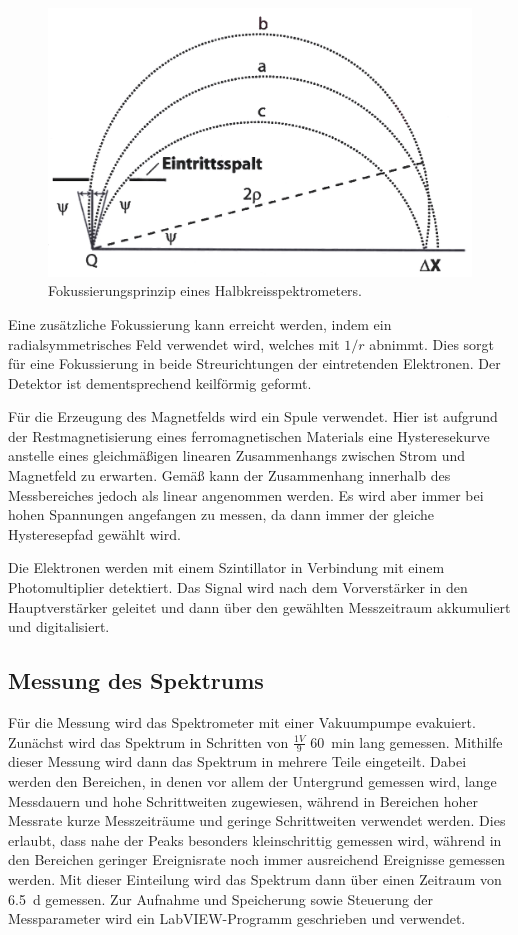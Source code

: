 \documentclass[
	a4paper,
	12pt,
	pagesize,
	ngerman
]{scrartcl}
\begin{document}
	\begin{figure}[H]
			\includegraphics[width= 0.6 \linewidth]{img/spektrometer_schema}
			\caption{
			Fokussierungsprinzip eines Halbkreisspektrometers.
			\cite{Anleitung}
			}
			\label{fig_Halbkreisspektrometer}
	\end{figure}

	Eine zusätzliche Fokussierung kann erreicht werden, indem ein radialsymmetrisches Feld verwendet wird, welches mit $1/r$ abnimmt.
	Dies sorgt für eine Fokussierung in beide Streurichtungen der eintretenden Elektronen.
	Der Detektor ist dementsprechend keilförmig geformt.

	Für die Erzeugung des Magnetfelds wird ein Spule verwendet.
	Hier ist aufgrund der Restmagnetisierung eines ferromagnetischen Materials eine Hysteresekurve anstelle eines gleichmäßigen linearen Zusammenhangs zwischen Strom und Magnetfeld zu erwarten. %
	Gemäß \cite{Anleitung} kann der Zusammenhang innerhalb des Messbereiches jedoch als linear angenommen werden.
	Es wird aber immer bei hohen Spannungen angefangen zu messen, da dann immer der gleiche Hysteresepfad gewählt wird.

	Die Elektronen werden mit einem Szintillator in Verbindung mit einem Photomultiplier detektiert.
	Das Signal wird nach dem Vorverstärker in den Hauptverstärker geleitet und dann über den gewählten Messzeitraum akkumuliert und digitalisiert.

	\subsection{Messung des Spektrums}

	Für die Messung wird das Spektrometer mit einer Vakuumpumpe evakuiert.
	Zunächst wird das Spektrum in Schritten von $\frac{1 \si{V}}{9}$  \SI{60}{\minute} lang gemessen. %
	Mithilfe dieser Messung wird dann das Spektrum in mehrere Teile eingeteilt.
	Dabei werden den Bereichen, in denen vor allem der Untergrund gemessen wird, lange Messdauern und hohe Schrittweiten zugewiesen, während in Bereichen hoher Messrate kurze Messzeiträume und geringe Schrittweiten verwendet werden.
	Dies erlaubt, dass nahe der Peaks besonders kleinschrittig gemessen wird, während in den Bereichen geringer Ereignisrate noch immer ausreichend Ereignisse gemessen werden.
	Mit dieser Einteilung wird das Spektrum dann über einen Zeitraum von \SI{6,5}{\day} gemessen.
	Zur Aufnahme und Speicherung sowie Steuerung der Messparameter wird ein LabVIEW-Programm geschrieben und verwendet.
\end{document}
